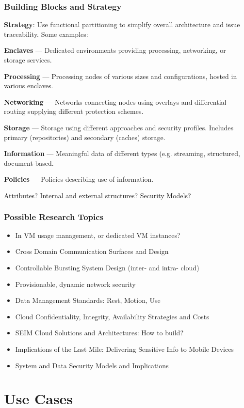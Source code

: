 \documentclass[t,handout]{beamer}
\begin{document}
\begin{frame}
\frametitle{Building Blocks and Strategy}
{\bf Strategy}: Use functional partitioning to simplify overall architecture and issue traceability. Some examples:
\begin{itemize}
{\small 
\item {\bf Enclaves} --- Dedicated environments providing processing, networking, or storage services.
\item {\bf Processing} --- Processing nodes of various sizes and configurations, hosted in various enclaves.
\item {\bf Networking} --- Networks connecting nodes using overlays and differential routing supplying different protection schemes.
\item {\bf Storage} --- Storage using different approaches and security profiles.  Includes primary (repositories) and secondary (caches) storage.
\item {\bf Information} --- Meaningful data of different types (e.g. streaming, structured, document-based.
\item {\bf Policies} --- Policies describing use of information.
}
\end{itemize}
Attributes? Internal and external structures? Security Models?
\end{frame}

\begin{frame}
\frametitle{Possible Research Topics}
\begin{itemize}
\item In VM usage management, or dedicated VM instances?
\item Cross Domain Communication Surfaces and Design
\item Controllable Bursting System Design  (inter- and intra- cloud)
\item Provisionable, dynamic network security
\item Data Management Standards: Rest, Motion, Use
\item Cloud Confidentiality, Integrity, Availability Strategies and Costs
\item SEIM Cloud Solutions and Architectures: How to build?
\item Implications of the Last Mile: Delivering Sensitive Info to Mobile Devices
\item System and Data Security Models and Implications
\end{itemize}
\end{frame}

\section{Use Cases}
\end{document}
